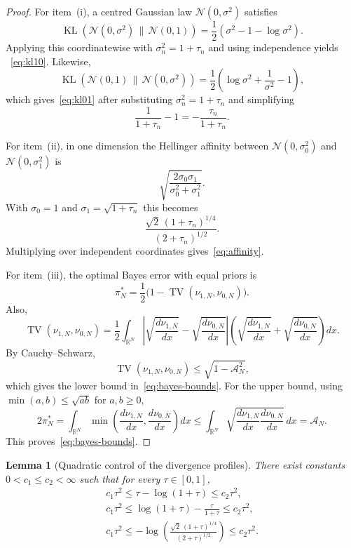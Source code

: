 \documentclass[11pt,a4paper]{amsart}
\theoremstyle{plain}
\newtheorem{lemma}[theorem]{Lemma}
\theoremstyle{definition}
\theoremstyle{remark}
\DeclareMathOperator{\KL}{KL}
\DeclareMathOperator{\TV}{TV}
\newcommand{\R}{\mathbb{R}}
\newcommand{\Acal}{\mathcal A}
\begin{document}
\begin{proof}
For item~(i), a centred Gaussian law $\mathcal N(0,\sigma^2)$ satisfies
\[
\KL(\mathcal N(0,\sigma^2)\,\|\,\mathcal N(0,1))
=
\frac12(\sigma^2-1-\log \sigma^2).
\]
Applying this coordinatewise with $\sigma_n^2=1+\tau_n$ and using independence yields
~\eqref{eq:kl10}. Likewise,
\[
\KL(\mathcal N(0,1)\,\|\,\mathcal N(0,\sigma^2))
=
\frac12\left(\log \sigma^2+\frac{1}{\sigma^2}-1\right),
\]
which gives~\eqref{eq:kl01} after substituting $\sigma_n^2=1+\tau_n$ and simplifying
\[
\frac{1}{1+\tau_n}-1=-\frac{\tau_n}{1+\tau_n}.
\]

For item~(ii), in one dimension the Hellinger affinity between
$\mathcal N(0,\sigma_0^2)$ and $\mathcal N(0,\sigma_1^2)$ is
\[
\sqrt{\frac{2\sigma_0\sigma_1}{\sigma_0^2+\sigma_1^2}}.
\]
With $\sigma_0=1$ and $\sigma_1=\sqrt{1+\tau_n}$ this becomes
\[
\frac{\sqrt{2}\,(1+\tau_n)^{1/4}}{(2+\tau_n)^{1/2}}.
\]
Multiplying over independent coordinates gives~\eqref{eq:affinity}.

For item~(iii), the optimal Bayes error with equal priors is
\[
\pi_N^\ast = \frac12\bigl(1-\TV(\nu_{1,N},\nu_{0,N})\bigr).
\]
Also,
\[
\TV(\nu_{1,N},\nu_{0,N})
=
\frac12\int_{\R^N} \left|
\sqrt{\frac{d\nu_{1,N}}{dx}}-\sqrt{\frac{d\nu_{0,N}}{dx}}
\right|
\left(
\sqrt{\frac{d\nu_{1,N}}{dx}}+\sqrt{\frac{d\nu_{0,N}}{dx}}
\right)dx.
\]
By Cauchy--Schwarz,
\[
\TV(\nu_{1,N},\nu_{0,N})
\le
\sqrt{1-\Acal_N^2},
\]
which gives the lower bound in~\eqref{eq:bayes-bounds}. For the upper bound, using
$\min(a,b)\le \sqrt{ab}$ for $a,b\ge0$,
\[
2\pi_N^\ast
=
\int_{\R^N} \min\!\left(\frac{d\nu_{1,N}}{dx},\frac{d\nu_{0,N}}{dx}\right)dx
\le
\int_{\R^N}\sqrt{\frac{d\nu_{1,N}}{dx}\frac{d\nu_{0,N}}{dx}}\,dx
=
\Acal_N.
\]
This proves~\eqref{eq:bayes-bounds}.
\end{proof}

\begin{lemma}[Quadratic control of the divergence profiles]\label{lem:quadratic}
There exist constants $0<c_1\le c_2<\infty$ such that for every $\tau\in[0,1]$,
\begin{align}
c_1\tau^2
\le
\tau-\log(1+\tau)
\le
c_2\tau^2, \label{eq:quad-kl10}\\
c_1\tau^2
\le
\log(1+\tau)-\frac{\tau}{1+\tau}
\le
c_2\tau^2, \label{eq:quad-kl01}\\
c_1\tau^2
\le
-\log\!\left(
\frac{\sqrt{2}\,(1+\tau)^{1/4}}{(2+\tau)^{1/2}}
\right)
\le
c_2\tau^2. \label{eq:quad-aff}
\end{align}
\end{lemma}
\end{document}
